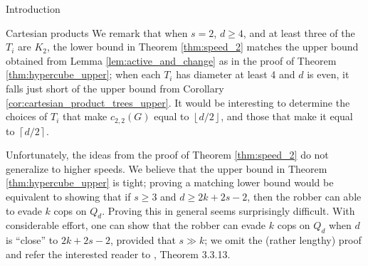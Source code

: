\documentclass[12pt]{amsart}
\newcommand{\floor}[1]{\ensuremath{\left\lfloor #1\right\rfloor} }
\newcommand{\ceil}[1]{\ensuremath{\left\lceil #1\right\rceil} }
\newcommand{\comment}[1]{\textcolor{red}{#1}}
\newtheorem{theorem}[lemma]{Theorem}
\theoremstyle{definition}
\newcommand{\speedtwo}{c_{2,2}}
\begin{document}
\begin{section}{Introduction}
\begin{section}{Cartesian products}
We remark that when $s=2$, $d \ge 4$, and at least three of the $T_i$ are $K_2$, the lower bound in Theorem \ref{thm:speed_2} matches the upper bound obtained from Lemma \ref{lem:active_and_change} as in the proof of Theorem \ref{thm:hypercube_upper}; when each $T_i$ has diameter at least 4 and $d$ is even, it falls just short of the upper bound from Corollary \ref{cor:cartesian_product_trees_upper}.  %
It would be interesting to determine the choices of $T_i$ that make $\speedtwo(G)$ equal to $\floor{d/2}$, and those that make it equal to $\ceil{d/2}$.

Unfortunately, the ideas from the proof of Theorem \ref{thm:speed_2} do not generalize to higher speeds.  We believe that the upper bound in Theorem \ref{thm:hypercube_upper} is tight; proving a matching lower bound would be equivalent to showing that if $s\ge 3$ and $d\ge 2k+2s-2$, then the robber can able to evade $k$ cops on $Q_d$.  Proving this in general seems surprisingly difficult.  With considerable effort, one can show that the robber can evade $k$ cops on $Q_d$ when $d$ is ``close'' to $2k+2s-2$, provided that $s \gg k$; we omit the (rather lengthy) proof and refer the interested reader to \cite{TowThesis}, Theorem 3.3.13.






    

\end{section}
\end{section}
\end{document}
